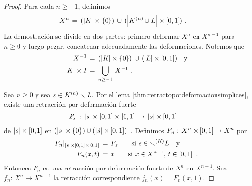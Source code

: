 \begin{proof}
	Para cada $n\geq -1$, definimos
	\begin{align*}
		X^{n} & \,=\,(\geom{K}\times\{0\})\,\cup\,
			(\geom{\qesq{n}{K}\cup L}\times\intervalo)
		\text{ .}
	\end{align*}
	La demostraci\'{o}n se divide en dos partes: primero deformar
	$X^{n}$ en $X^{n-1}$ para $n\geq 0$ y luego pegar, concatenar
	adecuadamente las deformaciones. Notemos que
	\begin{align*}
		X^{-1} & \,=\,(\geom{K}\times\{0\})\,\cup\,
			(\geom{L}\times\intervalo)\quad\text{y} \\
		\geom{K}\times I & \,=\,\bigcup_{n\geq -1}\,X^{-1}
		\text{ .}
	\end{align*}

	Sea $n\geq 0$ y sea $s\in\qesq{n}{K}\setmin L$. Por el lema
	\ref{thm:retractopordeformacionsimplices}, existe una retracci\'{o}n
	por deformaci\'{o}n fuerte
	\begin{align*}
		& F_{s}\,:\,\geom{s}\times\intervalo\times\intervalo
			\,\rightarrow\,
			\geom{s}\times\intervalo
	\end{align*}
	de $\geom{s}\times\intervalo$ en
	\begin{math}
		(\geom{s}\times\{0\})\cup
			(\geom{\carasp{s}}\times\intervalo)
	\end{math}~.
	Definimos $F_{n}:\,X^{n}\times\intervalo\rightarrow X^{n}$ por
	\begin{align*}
		F_{n}|_{\geom{s}\times\intervalo\times\intervalo} & \,=\,F_{s}
			\qquad\text{si }s\in\qesq{K}\setmin L\quad\text{y} \\
		F_{n}(x,t) & \,=\,x\qquad\text{si }
			x\in X^{n-1},\,t\in\intervalo
		\text{ .}
	\end{align*}
	Entonces $F_{n}$ es una retracci\'{o}n por deformaci\'{o}n fuerte
	de $X^{n}$ en $X^{n-1}$. Sea $f_{n}:\,X^{n}\rightarrow X^{n-1}$
	la retracci\'{o}n correspondiente $f_{n}(x)=F_{n}(x,1)$.


\end{proof}
